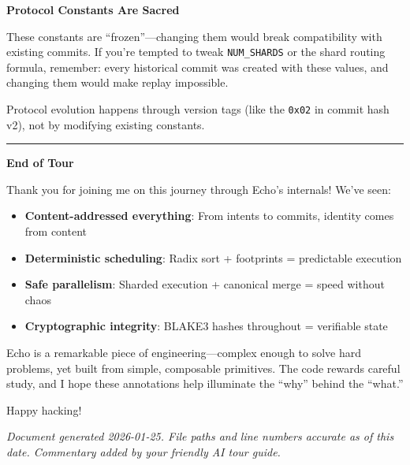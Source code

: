 \documentclass[11pt]{book}
\begin{document}
\begin{watchout}
\textbf{Protocol Constants Are Sacred}

These constants are ``frozen''---changing them would break compatibility with existing commits. If you're tempted to tweak \texttt{NUM\_SHARDS} or the shard routing formula, remember: every historical commit was created with these values, and changing them would make replay impossible.

Protocol evolution happens through version tags (like the \texttt{0x02} in commit hash v2), not by modifying existing constants.
\end{watchout}

\begin{center}\rule{0.5\linewidth}{0.5pt}\end{center}

\begin{tourguide}
\textbf{End of Tour}

Thank you for joining me on this journey through Echo's internals! We've seen:

\begin{itemize}
\item \textbf{Content-addressed everything}: From intents to commits, identity comes from content
\item \textbf{Deterministic scheduling}: Radix sort + footprints = predictable execution
\item \textbf{Safe parallelism}: Sharded execution + canonical merge = speed without chaos
\item \textbf{Cryptographic integrity}: BLAKE3 hashes throughout = verifiable state
\end{itemize}

Echo is a remarkable piece of engineering---complex enough to solve hard problems, yet built from simple, composable primitives. The code rewards careful study, and I hope these annotations help illuminate the ``why'' behind the ``what.''

Happy hacking!
\end{tourguide}

\emph{Document generated 2026-01-25. File paths and line numbers
accurate as of this date. Commentary added by your friendly AI tour guide.}

\backmatter
\end{document}
